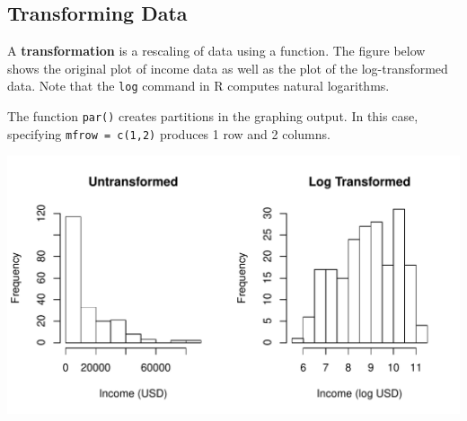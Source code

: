 \subsection{Transforming Data}
A \textbf{transformation} is a rescaling of data using a function. The figure below shows the original plot of income data as well as the plot of the log-transformed data. Note that the \texttt{log} command in \textsf{R} computes natural logarithms.

The function \texttt{par()} creates partitions in the graphing output. In this case, specifying \texttt{mfrow = c(1,2)} produces 1 row and 2 columns.

\begin{knitrout}
\color{fgcolor}\begin{kframe}
\begin{alltt}
\hlstd{(} \hlstd{=} \hlstd{(}\hlstd{,} \hlstd{))}  
\hlopt{$}  \hlstd{=} \hlstd{,}  \hlstd{=} \hlstd{,}
     \hlstd{=} \hlstd{,}  \hlstd{=} \hlstd{(}\hlstd{,} \hlstd{),}  \hlstd{=} \hlstd{)}

\hlstd{(}\hlopt{$}  \hlstd{=} \hlstd{,}  \hlstd{=} \hlstd{,}
     \hlstd{=} \hlstd{,}  \hlstd{=} \hlstd{(}\hlstd{,} \hlstd{),}  \hlstd{=} \hlstd{)}
\end{alltt}
\end{kframe}
\includegraphics[width=\maxwidth]{figure/unnamed-chunk-28-1} 

\end{knitrout}

